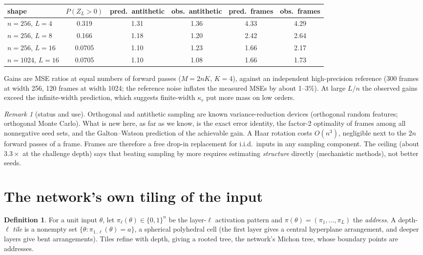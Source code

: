 \documentclass[11pt]{article}
\theoremstyle{definition}
\newtheorem{definition}[theorem]{Definition}
\theoremstyle{remark}
\newtheorem{remark}[theorem]{Remark}
\begin{document}
\begin{center}
\begin{tabular}{lccccc}
\toprule
shape & $P(Z_L>0)$ & pred.\ antithetic & obs.\ antithetic & pred.\ frames & obs.\ frames\\
\midrule
$n=256$, $L=4$ & 0.319 & 1.31 & 1.36 & 4.33 & 4.29\\
$n=256$, $L=8$ & 0.166 & 1.18 & 1.20 & 2.42 & 2.64\\
$n=256$, $L=16$ & 0.0705 & 1.10 & 1.23 & 1.66 & 2.17\\
$n=1024$, $L=16$ & 0.0705 & 1.10 & 1.08 & 1.66 & 1.73\\
\bottomrule
\end{tabular}
\end{center}
\noindent Gains are MSE ratios at equal numbers of forward passes ($M=2nK$, $K=4$), against an independent high-precision reference (300 frames at width 256, 120 frames at width 1024; the reference noise inflates the measured MSEs by about 1--3\%). At large $L/n$ the observed gains exceed the infinite-width prediction, which suggests finite-width $\kappa_r$ put more mass on low orders.

\begin{remark}[status and use]
Orthogonal and antithetic sampling are known variance-reduction devices (orthogonal random features; orthogonal Monte Carlo). What is new here, as far as we know, is the exact error identity, the factor-2 optimality of frames among all nonnegative seed sets, and the Galton--Watson prediction of the achievable gain. A Haar rotation costs $O(n^3)$, negligible next to the $2n$ forward passes of a frame. Frames are therefore a free drop-in replacement for i.i.d.\ inputs in any sampling component. The ceiling (about $3.3\times$ at the challenge depth) says that beating sampling by more requires estimating \emph{structure} directly (mechanistic methods), not better seeds.
\end{remark}

\section{The network's own tiling of the input}\label{sec:tiles}

\begin{definition}
For a unit input $\theta$, let $\pi_\ell(\theta)\in\{0,1\}^n$ be the layer-$\ell$ activation pattern and $\pi(\theta)=(\pi_1,\dots,\pi_L)$ the \emph{address}. A depth-$\ell$ \emph{tile} is a nonempty set $\{\theta:\pi_{1..\ell}(\theta)=a\}$, a spherical polyhedral cell (the first layer gives a central hyperplane arrangement, and deeper layers give bent arrangements). Tiles refine with depth, giving a rooted tree, the network's Michon tree, whose boundary points are addresses.
\end{definition}
\end{document}
